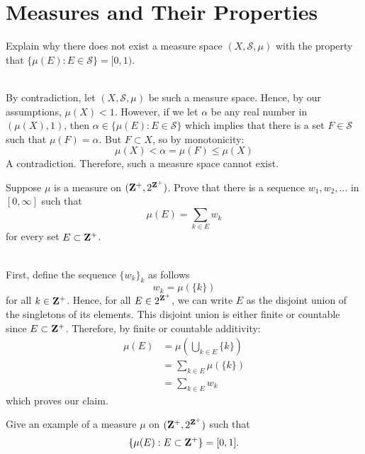 \section{Measures and Their Properties}

\begin{exercise}
    Explain why there does not exist a measure space $(X, \mathcal{S}, \mu)$ with the property that $\{ \mu(E) : E \in \mathcal{S}\} = [0, 1)$. \\
\end{exercise}

\begin{solution}
    \\ By contradiction, let $(X, \mathcal{S}, \mu)$ be such a measure space. Hence, by our assumptions, $\mu(X) < 1$. However, if we let $\alpha$ be any real number in $(\mu(X), 1)$, then $\alpha \in \{ \mu(E) : E \in \mathcal{S}\}$ which implies that there is a set $F \in \mathcal{S}$ such that $\mu(F) = \alpha$. But $F \subset X$, so by monotonicity:
    $$\mu(X) < \alpha = \mu(F) \leq \mu(X)$$
    A contradiction. Therefore, such a measure space cannot exist.\\
\end{solution}

\begin{exercise}
    Suppose $\mu$ is a measure on $(\mathbf{Z}^+, 2^{\mathbf{Z}^+})$. Prove that there is a sequence $w_1, w_2, ...$ in $[0, \infty]$ such that
    $$\mu(E) = \sum_{k \in E}w_k$$
    for every set $E \subset \mathbf{Z}^+$. \\
\end{exercise}

\begin{solution}
    \\ First, define the sequence $\{w_k\}_k$ as follows
    $$w_k = \mu( \{k\} )$$
    for all $k \in \mathbf{Z}^+$. Hence, for all $E \in 2^{\mathbf{Z}^+}$, we can write $E$ as the disjoint union of the singletons of its elements. This disjoint union is either finite or countable since $E \subset \mathbf{Z}^+$. Therefore, by finite or countable additivity:
    \begin{align*}
        \mu(E) &= \mu \left(\bigcup_{k \in E} \{k\}\right) \\
        &= \sum_{k \in E} \mu(\{k\}) \\
        &= \sum_{k \in E}w_k
    \end{align*}
    which proves our claim. \\
\end{solution}

\begin{exercise}
    Give an example of a measure $\mu$ on $(\mathbf{Z}^+, 2^{\mathbf{Z}^+})$ such that
    $$\{ \mu(E) : E \subset \mathbf{Z}^+\} = [0, 1].$$\\
\end{exercise}

